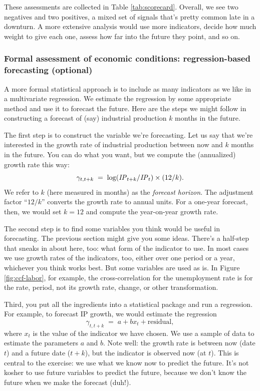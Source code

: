 \documentclass[letterpaper,12pt]{article}
\newcommand{\IP}{\mbox{\em IP\/}}
\begin{document}
These assessments are collected in Table \ref{tab:scorecard}.
Overall, we see two negatives and two positives,
a mixed set of signals that's pretty common late in a downturn.
A more extensive analysis would use more indicators,
decide how much weight to give each one,
assess how far into the future they point, and so on.


\subsubsection*{Formal assessment of economic conditions:
regression-based forecasting (optional)}

A more formal statistical approach is to include
as many indicators as we like in a multivariate regression.
We estimate the regression by some appropriate method
and use it to forecast the future.
Here are the steps we might follow in constructing a forecast
of (say) industrial production $k$ months in the future.

The first step is to construct the variable we're forecasting.
Let us say that we're interested in the growth rate of industrial
production between now and $k$ months in the future.
You can do what you want, but we compute the (annualized) growth
rate this way:
\[
    \gamma_{t,t+k} \;=\; \log (\IP_{t+k}/\IP_t) \times (12/k) .
\]
We refer to $k$ (here measured in months) as the {\it forecast
horizon\/}.  The adjustment factor ``$12/k$'' converts the growth
rate to annual units.
For a one-year forecast, then, we would set $k=12$ and compute the
year-on-year growth rate.

The second step is to find some variables you think would be useful
in forecasting.
The previous section might give you some ideas.
There's a half-step that sneaks in about here, too:
what form of the indicator to use.
In most cases we use growth rates of the indicators, too,
either over one period or a year,
whichever you think works best.
But some variables are used as is.
In Figure \ref{fig:ccf-labor}, for example,
the cross-correlation for the unemployment rate is for the rate, period,
not its growth rate, change, or other transformation.

Third, you put all the ingredients into a statistical package and run a regression.
For example, to forecast IP growth, we would estimate the regression
\[
        \gamma_{t,t+k}  \;=\;  a + b x_t + \mbox{residual},
\]
where $x_t$ is the value of the indicator we have chosen.
We use a sample of data to estimate the parameters $a$ and $b$.
Note well:  the growth rate is between now (date $t$)
and a future date ($t+k$),
but the indicator is observed now (at $t$).
This is central to the exercise:  we use what we know now
to predict the future.
It's not kosher to use future variables to predict the future,
because we don't know the future when we make the forecast
(duh!).
\end{document}

